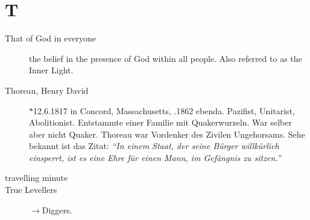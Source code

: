 \section*{T}

\articlesize

\begin{description}

 \item[That of God in everyone]
    the belief in the presence of God within all people. Also referred to as the Inner Light.
    
 \item[Thoreau, Henry David] $\ast$12.6.1817 in Concord, Massachusetts, .1862 ebenda. Pazifist, Unitarist, Abolitionist. Entstammte einer Familie mit Quakerwurzeln. War selber aber nicht Quaker. Thoreau war Vordenker des Zivilen Ungehorsams. Sehe bekannt ist das Zitat: \textit{"`In einem Staat, der seine Bürger willkürlich einsperrt, ist es eine Ehre für einen Mann, im Gefängnis zu sitzen."'}


 \item[travelling minute]

 \item[True Levellers] $\to$Diggers.

 \end{description}

\normalsize

